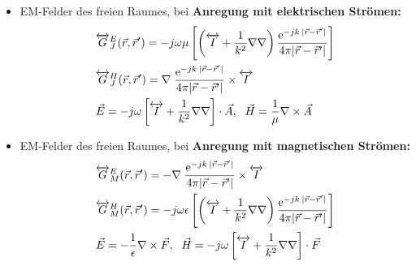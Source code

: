 {\begin{itemize}
\begin{align*}
            &\dyade{G}^A(\vec{r},\vec{r}^\prime) = \mu\dfrac{\mathrm{e}^{-jk\:|\vec{r} - \vec{r}^\prime|}}{4\pi|\vec{r} - \vec{r}^\prime|}\dyade{I},\\
            &\dyade{G}^F(\vec{r},\vec{r}^\prime) = \epsilon\dfrac{\mathrm{e}^{-jk\:|\vec{r} - \vec{r}^\prime|}}{4\pi|\vec{r} - \vec{r}^\prime|}\dyade{I}
        \end{align*}
    \item EM-Felder des freien Raumes, bei \textbf{Anregung mit elektrischen Strömen:}\\
        \begin{align*}
            &\overleftrightarrow{G}^E_J(\vec{r},\vec{r}^\prime) = -j\omega\mu\left[\left(\overleftrightarrow{I} + \dfrac{1}{k^2}\nabla\nabla\right) \dfrac{\mathrm{e}^{-jk\:|\vec{r} - \vec{r}^\prime|}}{4\pi|\vec{r} - \vec{r}^\prime|}\right]\\
            &\overleftrightarrow{G}^H_J(\vec{r},\vec{r}^\prime) = \nabla\;\dfrac{\mathrm{e}^{-jk\:|\vec{r} - \vec{r}^\prime|}}{4\pi|\vec{r} - \vec{r}^\prime|} \times \overleftrightarrow{I}\\
            &\vec{E} = -j\omega \left[\overleftrightarrow{I} + \dfrac{1}{k^2}\nabla\nabla\right] \cdot \vec{A},\;\
            \vec{H} = \dfrac{1}{\mu} \nabla \times \vec{A}
        \end{align*}
    \item EM-Felder des freien Raumes, bei \textbf{Anregung mit magnetischen Strömen:}\\
        \begin{align*}
            &\overleftrightarrow{G}^E_M(\vec{r},\vec{r}^\prime) = -\nabla\;\dfrac{\mathrm{e}^{-jk\:|\vec{r} - \vec{r}^\prime|}}{4\pi|\vec{r} - \vec{r}^\prime|} \times \overleftrightarrow{I}\\
            &\overleftrightarrow{G}^H_M(\vec{r},\vec{r}^\prime) = -j\omega\epsilon\left[\left(\overleftrightarrow{I} + \dfrac{1}{k^2}\nabla\nabla\right) \dfrac{\mathrm{e}^{-jk\:|\vec{r} - \vec{r}^\prime|}}{4\pi|\vec{r} - \vec{r}^\prime|}\right]\\
            &\vec{E} = -\dfrac{1}{\epsilon} \nabla \times \vec{F},\;\
            \vec{H} = -j\omega \left[\overleftrightarrow{I} + \dfrac{1}{k^2}\nabla\nabla\right] \cdot \vec{F}
        \end{align*}

\end{itemize}
}
